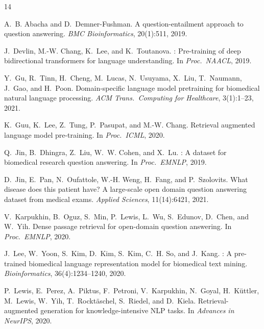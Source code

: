 \documentclass[11pt,a4paper]{article}
\begin{document}


\begin{thebibliography}{14}

A.~B. Abacha and D.~Demner-Fushman.
\newblock A question-entailment approach to question answering.
\newblock \emph{BMC Bioinformatics}, 20(1):511, 2019.

J.~Devlin, M.-W. Chang, K.~Lee, and K.~Toutanova.
: Pre-training of deep bidirectional transformers for language understanding.
\newblock In \emph{Proc.\ NAACL}, 2019.

Y.~Gu, R.~Tinn, H.~Cheng, M.~Lucas, N.~Usuyama, X.~Liu, T.~Naumann, J.~Gao, and H.~Poon.
\newblock Domain-specific language model pretraining for biomedical natural language processing.
\newblock \emph{ACM Trans.\ Computing for Healthcare}, 3(1):1--23, 2021.

K.~Guu, K.~Lee, Z.~Tung, P.~Pasupat, and M.-W. Chang.
\newblock Retrieval augmented language model pre-training.
\newblock In \emph{Proc.\ ICML}, 2020.

Q.~Jin, B.~Dhingra, Z.~Liu, W.~W. Cohen, and X.~Lu.
: A dataset for biomedical research question answering.
\newblock In \emph{Proc.\ EMNLP}, 2019.

D.~Jin, E.~Pan, N.~Oufattole, W.-H. Weng, H.~Fang, and P.~Szolovits.
\newblock What disease does this patient have? {A} large-scale open domain question answering dataset from medical exams.
\newblock \emph{Applied Sciences}, 11(14):6421, 2021.

V.~Karpukhin, B.~Oguz, S.~Min, P.~Lewis, L.~Wu, S.~Edunov, D.~Chen, and W.~Yih.
\newblock Dense passage retrieval for open-domain question answering.
\newblock In \emph{Proc.\ EMNLP}, 2020.

J.~Lee, W.~Yoon, S.~Kim, D.~Kim, S.~Kim, C.~H. So, and J.~Kang.
: A pre-trained biomedical language representation model for biomedical text mining.
\newblock \emph{Bioinformatics}, 36(4):1234--1240, 2020.

P.~Lewis, E.~Perez, A.~Piktus, F.~Petroni, V.~Karpukhin, N.~Goyal, H.~K\"{u}ttler, M.~Lewis, W.~Yih, T.~Rockt\"{a}schel, S.~Riedel, and D.~Kiela.
\newblock Retrieval-augmented generation for knowledge-intensive {NLP} tasks.
\newblock In \emph{Advances in NeurIPS}, 2020.


\end{thebibliography}
\end{document}
